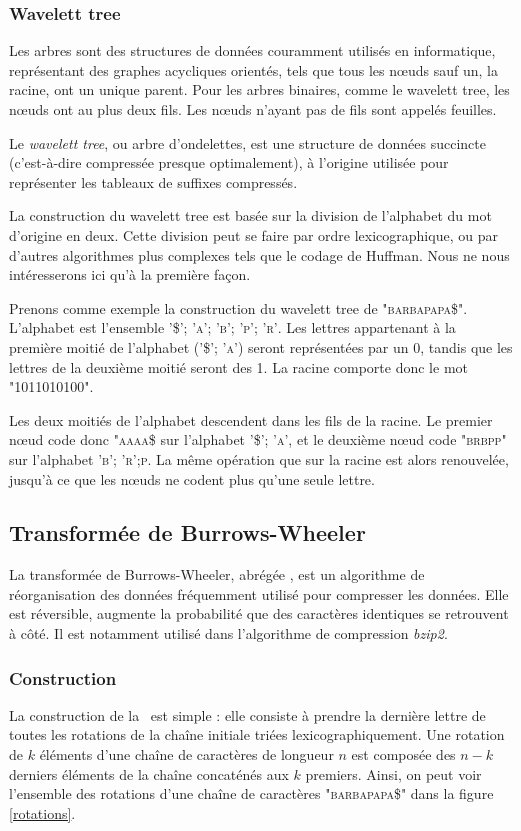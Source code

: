 \subsubsection{Wavelett tree}
Les arbres sont des structures de données couramment utilisés en informatique, représentant des graphes acycliques orientés, tels que tous les nœuds sauf un, la racine, ont un unique parent. Pour les arbres binaires, comme le wavelett tree, les nœuds ont au plus deux fils. Les nœuds n'ayant pas de fils sont appelés feuilles.

Le \textit{wavelett tree}, ou arbre d'ondelettes, est une structure de données succincte (c'est-à-dire compressée presque optimalement), à l'origine utilisée pour représenter les tableaux de suffixes compressés.

La construction du wavelett tree est basée sur la division de l'alphabet du mot d'origine en deux. Cette division peut se faire par ordre lexicographique, ou par d'autres algorithmes plus complexes tels que le codage de Huffman. Nous ne nous intéresserons ici qu'à la première façon.

Prenons comme exemple la construction du wavelett tree de \textsc{"barbapapa\$"}. L'alphabet est l'ensemble \textsc{{'\$'; 'a'; 'b'; 'p'; 'r'}}. Les lettres appartenant à la première moitié de l'alphabet (\textsc{{'\$'; 'a'}}) seront représentées par un 0, tandis que les lettres de la deuxième moitié seront des 1. La racine comporte donc le mot "1011010100".

Les deux moitiés de l'alphabet descendent dans les fils de la racine. Le premier nœud code donc \textsc{"aaaa\$} sur l'alphabet \textsc{{'\$'; 'a'}}, et le deuxième nœud code \textsc{"brbpp"} sur l'alphabet \textsc{{'b'; 'r';p}}. La même opération que sur la racine est alors renouvelée, jusqu'à ce que les nœuds ne codent plus qu'une seule lettre.


\subsection{Transformée de Burrows-Wheeler}

La transformée de Burrows-Wheeler, abrégée \bwt, est un algorithme de réorganisation des données  fréquemment utilisé pour compresser les données. Elle est réversible, augmente la probabilité que des caractères identiques se retrouvent à côté. Il est notamment utilisé dans l'algorithme de compression \emph{bzip2}. 

\subsubsection{Construction}
La construction de la \bwt\ est simple : elle consiste à prendre la dernière lettre de toutes les rotations de la chaîne initiale triées lexicographiquement.
Une rotation de $k$ éléments d'une chaîne de caractères de longueur $n$ est composée des $n-k$ derniers éléments de la chaîne concaténés aux $k$ premiers.
Ainsi, on peut voir l'ensemble des rotations d'une chaîne de caractères "\textsc{barbapapa\$}" dans la figure \ref{rotations}.

